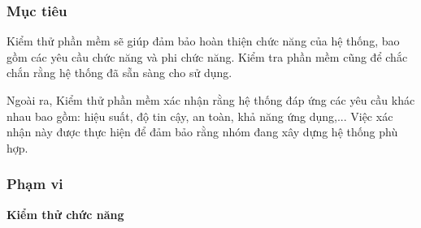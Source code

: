 \subsubsection{Mục tiêu}
Kiểm thử phần mềm sẽ giúp đảm bảo hoàn thiện chức năng của hệ thống, bao gồm các yêu cầu chức năng và phi chức năng. Kiểm tra phần mềm cũng để chắc chắn rằng hệ thống đã sẵn sàng cho sử dụng.\par

Ngoài ra, Kiểm thử phần mềm xác nhận rằng hệ thống đáp ứng các yêu cầu khác nhau bao gồm: hiệu suất, độ tin cậy, an toàn, khả năng ứng dụng,... Việc xác nhận này được thực hiện để đảm bảo rằng nhóm đang xây dựng hệ thống phù hợp.

\subsubsection{Phạm vi}
\textbf{Kiểm thử chức năng}
